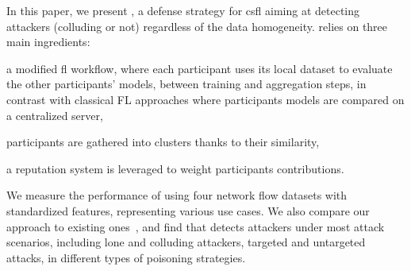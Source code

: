 In this paper, we present \thecontrib, a defense strategy for \gls{csfl} aiming at detecting attackers (colluding or not) regardless of the data homogeneity. \thecontrib relies on three main ingredients:
\begin{enumerate*}[label=\em {\roman*})]
    \item a modified \gls{fl} workflow, where each participant uses its local dataset to evaluate the other participants' models, between training and aggregation steps, in contrast with classical FL approaches where participants models are compared on a centralized server,
    \item participants are gathered into clusters thanks to their similarity,
    \item a reputation system is leveraged to weight participants contributions.
\end{enumerate*}

We measure the performance of \thecontrib using four network flow datasets with standardized features, representing various use cases.
We also compare our approach to existing ones~\cite{mcmahan_communication-efficient_2017,fung_limitations_2020}, and find that \thecontrib detects attackers under most attack scenarios, including lone and colluding attackers, targeted and untargeted attacks, in different types of poisoning strategies.

